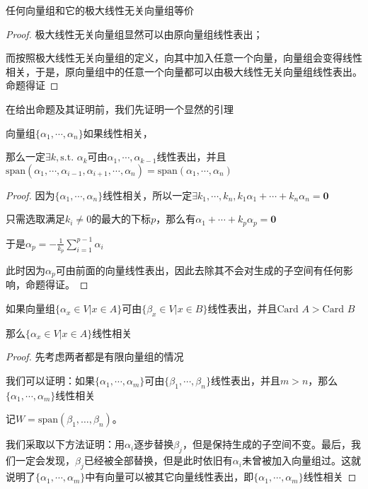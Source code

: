 \documentclass[12pt, a4paper, oneside, UTF8]{ctexbook}
\begin{document}
			\begin{para}{0}
				\point{}
					\begin{proposition}
						任何向量组和它的极大线性无关向量组等价
					\end{proposition}
					\begin{proof}
						极大线性无关向量组显然可以由原向量组线性表出；

						而按照极大线性无关向量组的定义，向其中加入任意一个向量，向量组会变得线性相关，于是，原向量组中的任意一个向量都可以由极大线性无关向量组线性表出。命题得证
					\end{proof}
					在给出命题及其证明前，我们先证明一个显然的引理
					\begin{lemma}{}{}
						向量组$\{\alpha_1,\cdots,\alpha_n\}$如果线性相关，
						
						那么一定$\exists k,\text{s.t. }\alpha_k$可由$\alpha_1,\cdots,\alpha_{k-1}$线性表出，并且$\text{span}(\alpha_1,\cdots,\alpha_{i-1},\alpha_{i+1},\cdots,\alpha_n)=\text{span}(\alpha_1,\cdots,\alpha_n)$
					\end{lemma}
					\begin{proof}
						因为$\{\alpha_1,\cdots,\alpha_n\}$线性相关，所以一定$\exists k_1,\cdots,k_n,k_1 \alpha_1+\cdots+k_n \alpha_n = \mathbf{0}$

						只需选取满足$k_i \neq 0$的最大的下标$p$，那么有$\alpha_1+\cdots+k_p \alpha_p = \mathbf{0}$

						于是$\alpha_p = -\frac{1}{k_p} \sum\limits_{i=1}^{p-1} \alpha_i$

						此时因为$\alpha_p$可由前面的向量线性表出，因此去除其不会对生成的子空间有任何影响，命题得证。
					\end{proof}
					\begin{proposition}
						如果向量组$\{\alpha_x \in V| x \in A\}$可由$\{\beta_x \in V| x \in B\}$线性表出，并且$\text{Card } A > \text{Card }B$

						那么$\{\alpha_x \in V| x \in A\}$线性相关
					\end{proposition}
					\begin{proof}
						先考虑两者都是有限向量组的情况

						我们可以证明：如果$\{\alpha_1,\cdots,\alpha_m\}$可由$\{\beta_1,\cdots,\beta_n\}$线性表出，并且$m > n$，那么$\{\alpha_1,\cdots,\alpha_m\}$线性相关

						记$W=\text{span}(\beta _1, \dots, \beta _n)$。

						我们采取以下方法证明：用$\alpha_i$逐步替换$\beta_j$，但是保持生成的子空间不变。最后，我们一定会发现，$\beta_j$已经被全部替换，但是此时依旧有$\alpha_i$未曾被加入向量组过。这就说明了$\{\alpha_1,\cdots,\alpha_m\}$中有向量可以被其它向量线性表出，即$\{\alpha_1,\cdots,\alpha_m\}$线性相关
						

\end{proof}
\end{para}
\end{document}
